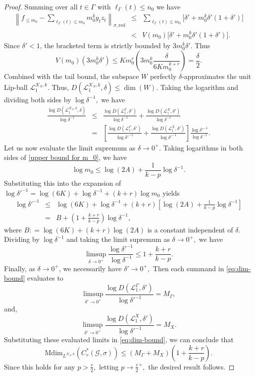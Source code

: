 \documentclass[10pt,a4paper]{amsart}
\newcommand{\Bea}{\begin{eqnarray*}}
\newcommand{\Eea}{\end{eqnarray*}}
\newcommand{\bea}{\begin{eqnarray}}
\newcommand{\eea}{\end{eqnarray}}
\begin{document}
\begin{proof}
Summing over all $t \in \Gamma$ with $\ell_{\Gamma} (t) \leq n_0$ we have
\Bea
    \left\| f_{\le m_0} - \sum_{\ell_{\Gamma} (t) \leq m_0} m_0^k y_t z_t \right\|_{\sigma, \mathrm{red}} & \leq & \sum_{\ell_{\Gamma} (t) \le m_0} \Big[ \delta' + m_0^k \delta'(1 + \delta') \Big] \\
    & < & V(m_0) \Big[ \delta' + m_0^k \delta'(1 + \delta') \Big].
\Eea
Since $\delta' < 1$, the bracketed term is strictly bounded by $3 m_0^k \delta'.$ Thus 
$$V(m_0) \left( 3 m_0^k \delta' \right) \le K m_0^{r} \left( 3 m_0^k \frac{\delta}{6 K m_0^{k + r}} \right) = \frac{\delta}{2}.$$
Combined with the tail bound, the subspace $W$ perfectly $\delta$-approximates the unit Lip-ball $\mathcal L_1^{\mathcal{K}_S, k}$. Thus, $D(\mathcal {L}_1^{\mathcal{K}_S, k}, \delta) \le \dim(W)$. Taking the logarithm and dividing both sides by $\log \delta^{-1},$ we have
\bea \label{eq:dim-bound}
\frac{\log D(\mathcal{L}_1^{\mathcal{K}_S, k}, \delta)}{\log \delta^{-1}} & \leq & \frac{\log D(\mathcal{L}_1^{\Gamma}, \delta')}{\log \delta^{-1}} + \frac{\log D(\mathcal{L}_1^X, \delta')}{\log \delta^{-1}} \nonumber \\
& = & \left[ \frac{\log D(\mathcal{L}_1^{\Gamma}, \delta')}{\log \delta'^{-1}} + \frac{\log D(\mathcal{L}_1^X, \delta')}{\log \delta'^{-1}} \right] \frac{\log \delta'^{-1}}{\log \delta^{-1}}.
\eea
Let us now evaluate the limit supremum as $\delta \to 0^+$. Taking logarithms in both sides of \eqref{upper bound for m_0}, we have
$$\log m_0 \leq \log(2A) + \frac{1}{k-p} \log \delta^{-1}.$$
Substituting this into the expansion of $\log \delta'^{-1} = \log(6K) + \log \delta^{-1} + (k + r) \log m_0$ yields
\Bea
\log \delta'^{-1} & \leq & \log(6 K) + \log \delta^{-1} + (k + r) \left[ \log(2A) + \frac{1}{k-p} \log \delta^{-1} \right] \\
& = & B + \left( 1 + \frac{k + r}{k - p} \right) \log \delta^{-1},
\Eea
where $B : = \log(6K) + (k + r)\log(2A)$ is a constant independent of $\delta$. Dividing by $\log \delta^{-1}$ and taking the limit supremum as $\delta \to 0^+,$ we have
$$\limsup_{\delta \to 0^+} \frac{\log \delta'^{-1}}{\log \delta^{-1}} \le 1 + \frac{k + r}{k - p}.$$
Finally, as $\delta \to 0^+$, we necessarily have $\delta' \to 0^+,$ Then each summand in \eqref{eq:dim-bound} evaluates to
$$\limsup\limits_{\delta' \to 0^+} \frac{\log D(\mathcal{L}_1^{\Gamma}, \delta')}{\log \delta'^{-1}} = M_{\Gamma},$$
and,
$$\limsup\limits_{\delta' \to 0^+} \frac{\log D(\mathcal{L}_1^X, \delta')}{\log \delta'^{-1}} = M_X.$$
Substituting these evaluated limits in \eqref{eq:dim-bound}, we can conclude that
$$\mathrm{Mdim}_{L^{\mathcal{K}_S, k}}(C_r^*(\mathcal{G}, \sigma)) \le \left( M_{\Gamma} + M_X \right) \left( 1 + \frac{k + r}{k - p} \right ).$$
Since this holds for any $p > \frac {r} {2},$ letting $p \to \frac {r} {2}^{+},$ the desired result follows.
\end{proof}
\end{document}
